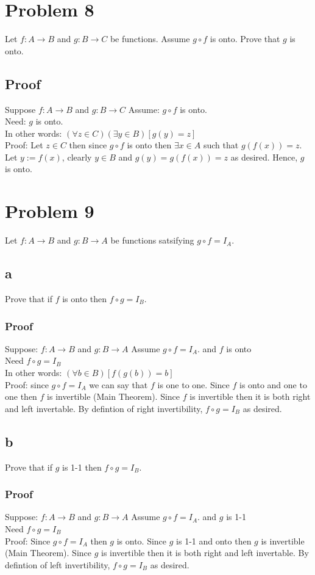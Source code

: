 \documentclass{article}
\begin{document}
\section*{Problem 8}
Let $f : A \rightarrow B$ and $g : B \rightarrow C$ be functions. Assume $g \circ f$ is onto. Prove that $g$ is onto.
\subsection*{Proof}
Suppose $f : A \rightarrow B$ and $g : B \rightarrow C$
Assume: $g \circ f$ is onto. \\
Need: $g$ is onto. \\
In other words: $(\forall z \in C)(\exists y \in B)[g(y) = z]$\\
Proof: Let $z \in C$ then since $g \circ f$ is onto then $\exists x \in A$ such that $g(f(x)) = z$. Let $y := f(x)$, clearly $y \in B$ and $g(y) = g(f(x)) = z$ as desired. Hence, $g$ is onto.
\section*{Problem 9}
Let $f : A \rightarrow B$  and $g : B \rightarrow A$ be functions satsifying $g \circ f = I_A$.
\subsection*{a}
Prove that if $f$ is onto then $f \circ g = I_B$.
\subsubsection*{Proof}
Suppose: $f : A \rightarrow B$  and $g : B \rightarrow A$ 
Assume $g \circ f = I_A$. and $f$ is onto \\
Need $f \circ g = I_B$ \\
In other words: $(\forall b \in B)[f(g(b)) = b]$\\
Proof: since $g \circ f = I_A$ we can say that $f$ is one to one. 
Since $f$ is onto and one to one then $f$ is invertible (Main Theorem).
Since $f$ is invertible then it is both right and left invertable. 
By defintion of right invertibility, $f \circ g = I_B$ as desired.

\subsection*{b}
Prove that if $g$ is 1-1 then $f \circ g = I_B$.
\subsubsection*{Proof}
Suppose: $f : A \rightarrow B$  and $g : B \rightarrow A$
Assume $g \circ f = I_A$. and $g$ is 1-1 \\
Need $f \circ g = I_B$ \\
Proof: Since $g \circ f = I_A$ then $g$ is onto.
Since $g$ is 1-1 and onto then $g$ is invertible (Main Theorem).
Since $g$ is invertible then it is both right and left invertable.
By defintion of left invertibility, $f \circ g = I_B$ as desired.
\end{document}
